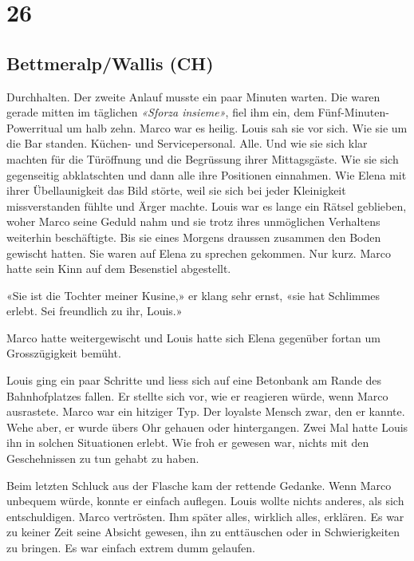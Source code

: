 \chapter{26}

\section{Bettmeralp/Wallis (CH)}



Durchhalten. Der zweite Anlauf musste ein paar Minuten warten.
Die waren gerade mitten im täglichen \emph{«Sforza insieme»}, fiel ihm
ein, dem Fünf-Minuten-Powerritual um halb zehn. Marco war es heilig.
Louis sah sie vor sich. Wie sie um die Bar standen. Küchen- und
Servicepersonal. Alle. Und wie sie sich klar machten für die Türöffnung
und die Begrüssung ihrer Mittagsgäste. Wie sie sich gegenseitig
abklatschten und dann alle ihre Positionen einnahmen. Wie Elena mit
ihrer Übellaunigkeit das Bild störte, weil sie sich bei jeder
Kleinigkeit missverstanden fühlte und Ärger machte. Louis war es lange
ein Rätsel geblieben, woher Marco seine Geduld nahm und sie trotz ihres
unmöglichen Verhaltens weiterhin beschäftigte. Bis sie eines Morgens draussen zusammen den Boden gewischt hatten. 
Sie waren auf Elena zu sprechen gekommen. Nur kurz. Marco hatte sein Kinn auf dem Besenstiel abgestellt.

«Sie ist die Tochter meiner Kusine,» er klang sehr ernst, «sie hat
Schlimmes erlebt. Sei freundlich zu ihr, Louis.»

Marco hatte weitergewischt und Louis hatte sich Elena gegenüber fortan
um Grosszügigkeit bemüht.

\sectionbreak

Louis ging ein paar Schritte und liess sich auf eine Betonbank am Rande des Bahnhofplatzes fallen. Er stellte sich vor, wie er reagieren würde, wenn Marco ausrastete. Marco war ein hitziger Typ. Der loyalste Mensch zwar, den er kannte. Wehe aber, er wurde übers Ohr gehauen oder hintergangen. Zwei Mal hatte Louis ihn in solchen Situationen erlebt. Wie froh er gewesen war, nichts mit den Geschehnissen zu tun gehabt zu haben.

Beim letzten Schluck aus der Flasche kam der rettende Gedanke. 
Wenn Marco unbequem würde, konnte er einfach auflegen. Louis wollte
nichts anderes, als sich entschuldigen. Marco vertrösten. Ihm später
alles, wirklich alles, erklären. Es war zu keiner Zeit seine Absicht
gewesen, ihn zu enttäuschen oder in Schwierigkeiten zu bringen. Es war
einfach extrem dumm gelaufen. 

